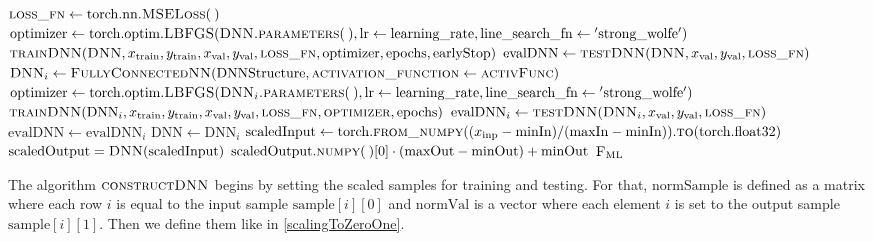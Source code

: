 \begin{algorithm}[H]
\begin{algorithmic}[1]
\State $\textproc{loss\_fn} \gets \mathrm{torch.nn.}\Call{MSELoss}{\:}$
\State $\mathrm{optimizer} \gets \mathrm{torch.optim.}\Call{LBFGS}{\protect\Call{DNN.parameters}{\:}, \mathrm{lr}\gets\mathrm{learning\_rate}, \mathrm{line\_search\_fn}\gets\mathrm{'strong\_wolfe'}}$
\State $\Call{trainDNN}{\textproc{DNN}, x_\mathrm{train}, y_\mathrm{train}, x_\mathrm{val}, y_\mathrm{val}, \textproc{loss\_fn}, \mathrm{optimizer}, \mathrm{epochs}, \mathrm{earlyStop}}$
\State\label{defEvalDNN} $\mathrm{evalDNN} \gets \Call{testDNN}{\textproc{DNN}, x_\mathrm{val}, y_\mathrm{val}, \textproc{loss\_fn}}$
\State $\textproc{DNN}_i \gets \Call{FullyConnectedNN}{\mathrm{DNNStructure}, \textproc{activation\_function}\gets\textproc{activFunc}}$
\State $\mathrm{optimizer} \gets \mathrm{torch.optim.}\Call{LBFGS}{\protect\Call{DNN$_i$.parameters}{\:}, \mathrm{lr}\gets\mathrm{learning\_rate}, \mathrm{line\_search\_fn}\gets\mathrm{'strong\_wolfe'}}$
\State $\Call{trainDNN}{\mathrm{DNN}_i, x_\mathrm{train}, y_\mathrm{train}, x_\mathrm{val}, y_\mathrm{val}, \textproc{loss\_fn}, \textproc{optimizer}, \mathrm{epochs}}$
\State $\mathrm{evalDNN}_i \gets \Call{testDNN}{\textproc{DNN}_i, x_\mathrm{val}, y_\mathrm{val}, \textproc{loss\_fn}}$
\State $\mathrm{evalDNN} \gets \mathrm{evalDNN}_i$
\State $\mathrm{DNN} \gets \mathrm{DNN}_i$
\EndIf
\EndFor
\State $\mathrm{scaledInput} \gets \mathrm{torch.}\Call{from\_numpy}{(x_\mathrm{inp}-\mathrm{minIn})/(\mathrm{maxIn}-\mathrm{minIn})}.\Call{to}{\mathrm{torch.float32}}$
\State $\mathrm{scaledOutput} = \Call{DNN}{\mathrm{scaledInput}}$
\State \Return $\mathrm{scaledOutput.}\Call{numpy}{\:}[0]\cdot(\mathrm{maxOut}-\mathrm{minOut})+\mathrm{minOut}$
\EndFunction
\State \Return $\textproc{F$_\mathrm{ML}$}$
\EndFunction
\end{algorithmic}
\end{algorithm}

The algorithm $\textproc{constructDNN}$ begins by setting the scaled samples for training and testing. For that, $\mathrm{normSample}$ is defined as a matrix where each row $i$ is equal to the input sample $\mathrm{sample}[i][0]$ and $\mathrm{normVal}$ is a vector where each element $i$ is set to the output sample $\mathrm{sample}[i][1]$. Then we define them like in \eqref{scalingToZeroOne}.

